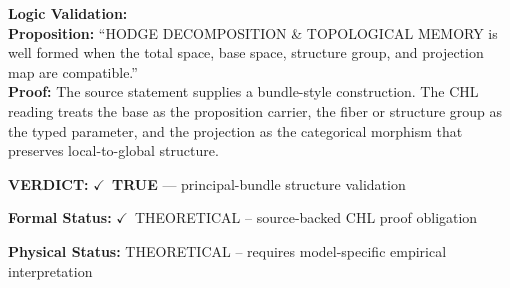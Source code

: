 \textbf{Logic Validation:}\\
\textbf{Proposition:} ``HODGE DECOMPOSITION \& TOPOLOGICAL MEMORY is well formed when the total space, base
space, structure group, and projection map are compatible.''\\
\textbf{Proof:} The source statement supplies a bundle-style construction. The CHL reading treats the
base as the proposition carrier, the fiber or structure group as the typed parameter,
and the projection as the categorical morphism that preserves local-to-global structure.

\textbf{VERDICT:} \ensuremath{\checkmark}\ \textbf{TRUE} --- principal-bundle structure validation

\textbf{Formal Status:} \ensuremath{\checkmark}\ THEORETICAL -- source-backed CHL proof obligation

\textbf{Physical Status:} THEORETICAL -- requires model-specific empirical interpretation
\par\vspace{0.45em}
\par
\ifTZPDarkEdition
{}
\fi
\endgroup
\endgroup
